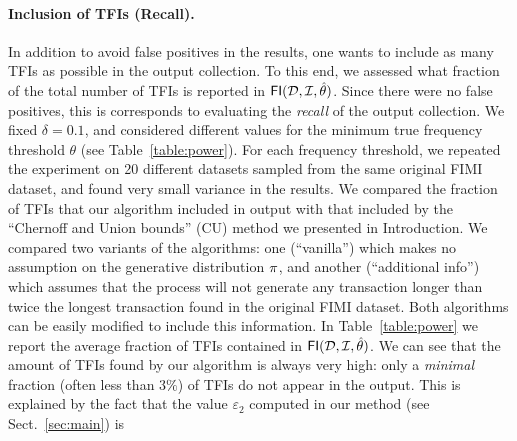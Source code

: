 \paragraph*{Inclusion of TFIs (Recall).}
In addition to avoid false positives in the results, one wants to include as many TFIs
as possible in the output collection. To this end, we assessed what fraction of
the total number of TFIs is reported in $\mathsf{FI}({\cal D},{\cal I},\hat\theta)$. Since there
were no false positives, this is corresponds to evaluating the \emph{recall} of
the output collection. We fixed $\delta=0.1$, and considered different values
for the minimum true frequency threshold $\theta$ (see Table~\ref{table:power}).
For each frequency threshold, we repeated the experiment on 20 different
datasets sampled from the same original FIMI dataset, %
and found very small variance in the results.  %
We compared the fraction of TFIs that our algorithm included in output with that
included by the ``Chernoff and Union bounds'' (CU) method we presented in
Introduction. We compared two variants of the algorithms: one
(``vanilla'') which makes no assumption on the generative distribution $\pi$,
and another (``additional info'') which assumes that the process will not
generate any transaction longer than twice the longest transaction found in the
original FIMI dataset. Both algorithms can be easily modified to include this
information. In Table~\ref{table:power} we report the average fraction of TFIs
contained in $\mathsf{FI}({\cal D},{\cal I},\hat\theta)$.
We can see that the amount of TFIs
found by our algorithm is always very high: only a \emph{minimal}
fraction (often less than $3\%$) %
of TFIs do not appear in the output. This is explained by the fact that the
value $\varepsilon_2$ computed in our method (see Sect.~\ref{sec:main}) is

